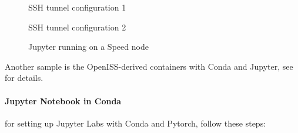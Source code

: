 \begin{figure}[htbp]
	\centering
	\caption{SSH tunnel configuration 1}
	\label{fig:putty1}
\end{figure}

\begin{figure}[htbp]
	\centering
	\caption{SSH tunnel configuration 2}
	\label{fig:putty2}
\end{figure}

\begin{figure}[htbp]
	\centering
	\caption{Jupyter running on a Speed node}
	\label{fig:jupyter}
\end{figure}

\noindent Another sample is the OpenISS-derived containers with Conda and Jupyter,
see  for details.

\paragraph{Jupyter Notebook in Conda}
\label{sect:jupyter-conda}
for setting up Jupyter Labs with Conda and Pytorch, follow these steps:

